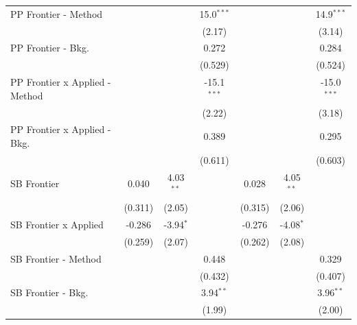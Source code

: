 \begin{tabular}{lcccccc}
   PP Frontier - Method           &               &             & 15.0$^{***}$  &               &             & 14.9$^{***}$\\   
                                  &               &             & (2.17)        &               &             & (3.14)\\   
   PP Frontier - Bkg.             &               &             & 0.272         &               &             & 0.284\\   
                                  &               &             & (0.529)       &               &             & (0.524)\\   
   PP Frontier x Applied - Method &               &             & -15.1$^{***}$ &               &             & -15.0$^{***}$\\   
                                  &               &             & (2.22)        &               &             & (3.18)\\   
   PP Frontier x Applied - Bkg.   &               &             & 0.389         &               &             & 0.295\\   
                                  &               &             & (0.611)       &               &             & (0.603)\\   
   SB Frontier                    & 0.040         & 4.03$^{**}$ &               & 0.028         & 4.05$^{**}$ &   \\   
                                  & (0.311)       & (2.05)      &               & (0.315)       & (2.06)      &   \\   
   SB Frontier x Applied          & -0.286        & -3.94$^{*}$ &               & -0.276        & -4.08$^{*}$ &   \\   
                                  & (0.259)       & (2.07)      &               & (0.262)       & (2.08)      &   \\   
   SB Frontier - Method           &               &             & 0.448         &               &             & 0.329\\   
                                  &               &             & (0.432)       &               &             & (0.407)\\   
   SB Frontier - Bkg.             &               &             & 3.94$^{**}$   &               &             & 3.96$^{**}$\\   
                                  &               &             & (1.99)        &               &             & (2.00)\\   

\end{tabular}
